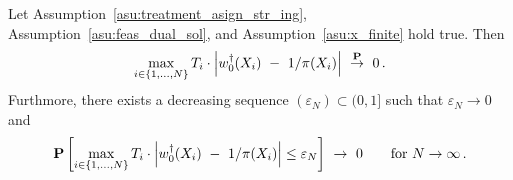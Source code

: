 \begin{theorem}
  \label{th:max_weight_cons}
Let
Assumption~\eqref{asu:treatment_asign_str_ing}, Assumption~\ref{asu:feas_dual_sol}, and Assumption~\ref{asu:x_finite} hold true.
Then
  \begin{align*}
    \max_{i\in \left\{ 1,\ldots,N \right\}}
    T_i\cdot
    \left| 
  w_0^\dagger(X_i)
  \ 
  -
  \ 
  1/\pi(X_i)
    \right|
  \ 
  \overset{\P}{\to}
  \ 
  0
  \,.
  \end{align*}
  Furthmore, there exists a decreasing sequence $(\varepsilon_N)\subset(0,1]$ such that $\varepsilon_N\to 0$ and 
  \begin{gather*}
    \P
    \left[ 
    \max_{i\in \left\{ 1,\ldots,N \right\}}
    T_i\cdot
    \left| 
  w_0^\dagger(X_i)
  \ 
  -
  \ 
  1/\pi(X_i)
    \right|
    \le
    \varepsilon_N
    \right]
  \  
  \to
  \  
  0
  \qquad
  \text{for}
  \ 
  N\to\infty
  \,.
  \end{gather*}
\end{theorem}
